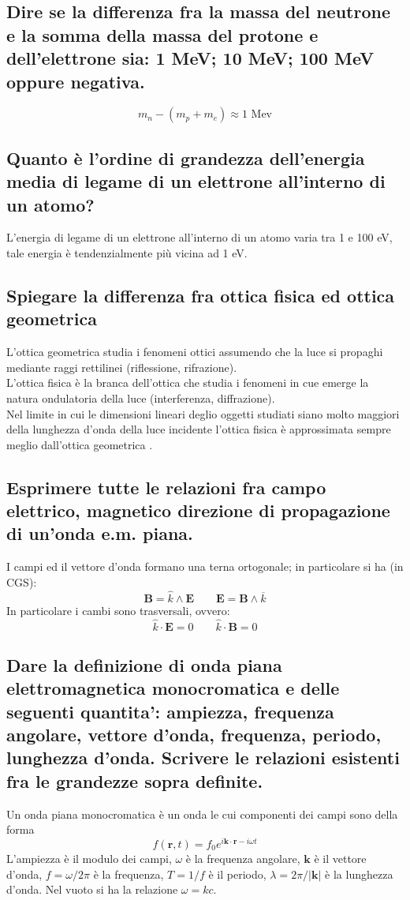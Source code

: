 \subsection[][$m_e, m_p, m_n$]{ Dire se la differenza fra la massa del neutrone e la somma della massa del protone e dell’elettrone sia: 1 MeV; 10 MeV; 100 MeV oppure negativa.}
\[
	m_n - \left( m_p + m_e \right) \approx 1 \text{ Mev} 
\] 
\subsection[]{ Quanto è l’ordine di grandezza dell’energia media di legame di un elettrone all’interno di un atomo?}
L'energia di legame di un elettrone all'interno di un atomo varia tra 1 e 100 eV, tale energia è tendenzialmente più vicina ad 1 eV.
\subsection[]{ Spiegare la differenza fra ottica fisica ed ottica geometrica}
L'ottica geometrica studia i fenomeni ottici assumendo che la luce si propaghi mediante raggi rettilinei (riflessione, rifrazione).\\ 
L'ottica fisica è la branca dell'ottica che studia i fenomeni in cue emerge la natura ondulatoria della luce (interferenza, diffrazione).\\
Nel limite in cui le dimensioni lineari deglio oggetti studiati siano molto maggiori della lunghezza d'onda della luce incidente l'ottica fisica è approssimata sempre meglio dall'ottica geometrica .
\subsection[]{ Esprimere tutte le relazioni fra campo elettrico, magnetico direzione di propagazione di un’onda e.m. piana.}
I campi ed il vettore d'onda formano una terna ortogonale; in particolare si ha (in CGS):
\[
	\boldsymbol{B} = \hat{k} \wedge \boldsymbol{E} \quad \quad 
	\boldsymbol{E} = \boldsymbol{B} \wedge \overline{k} 
\] 
In particolare i cambi sono trasversali, ovvero:
\[
	\hat{k} \cdot \boldsymbol{E} = 0 \quad \quad 
	\hat{k} \cdot \boldsymbol{B} = 0
\] 

\subsection[]{ Dare la definizione di onda piana elettromagnetica monocromatica e delle seguenti quantita’: ampiezza, frequenza angolare, vettore d’onda, frequenza, periodo, lunghezza
d’onda. Scrivere le relazioni esistenti fra le grandezze sopra definite.}
Un onda piana monocromatica è un onda le cui componenti dei campi sono della forma 
\[
	f\left( \boldsymbol{r}, t \right) = f_{0} e^{i \boldsymbol{k} \cdot \boldsymbol{r} - i \omega t }
\] 
L'ampiezza è il modulo dei campi, $\omega$ è la frequenza angolare, $\boldsymbol{k}$ è il vettore d'onda, $f = \omega/2\pi$ è la frequenza, $T = 1/f$ è il periodo, $\lambda = 2\pi/\boldsymbol{|k|}$ è la lunghezza d'onda. Nel vuoto si ha la relazione $\omega = k c$.

